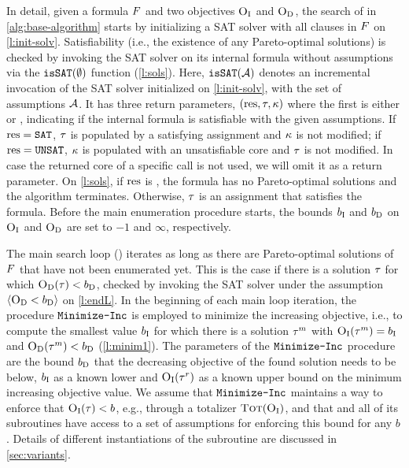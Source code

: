 In detail, given a formula $F$ and two objectives $\textsc{O}_{\text{I}}$ and $\textsc{O}_{\text{D}}$, the search of \algname{} in \cref{alg:base-algorithm} starts by initializing a SAT solver with all clauses in $F$ on \cref{l:init-solv}.
Satisfiability (i.e., the existence of any Pareto-optimal solutions) is checked by invoking the SAT solver on its internal formula without assumptions via the $\texttt{isSAT}(\emptyset)$ function (\cref{l:sols}).
Here, $\texttt{isSAT}(\mathcal{A})$ denotes an incremental invocation of the SAT solver initialized on \cref{l:init-solv}, with the set of assumptions $\mathcal{A}$.
It has three return parameters, $(\text{res},\tau,\kappa)$ where the first is either \sat{} or \unsat{}, indicating if the internal formula is satisfiable with the given assumptions.
If $\text{res}=\texttt{SAT}$, $\tau$ is populated by a satisfying assignment and $\kappa$ is not modified;
if $\text{res}=\texttt{UNSAT}$, $\kappa$ is populated with an unsatisfiable core and $\tau$ is not modified.
In case the returned core of a specific call is not used, we will omit it as a return parameter.
On \cref{l:sols}, if $\text{res}$ is \unsat{}, the formula has no Pareto-optimal solutions and the algorithm terminates.
Otherwise, $\tau$ is an assignment that satisfies the formula.
Before the main enumeration procedure starts, the bounds $b_{\text{I}}$ and $b_{\text{D}}$ on $\textsc{O}_{\text{I}}$ and $\textsc{O}_{\text{D}}$ are set to $-1$ and $\infty$, respectively.

The main search loop () iterates as long as there are Pareto-optimal solutions of $F$ that have not been enumerated yet. 
This is the case if there is a solution $\tau$ for which $\textsc{O}_{\text{D}}(\tau) < b_{\text{D}}$, checked by invoking the SAT solver under the assumption $\langle \textsc{O}_{\text{D}} < b_{\text{D}} \rangle$ on \cref{l:endL}.
In the beginning of each main loop iteration, the procedure $\texttt{Minimize-\allowbreak{}Inc}$ is employed to minimize the increasing objective, i.e., to compute the smallest value $b_{\text{I}}$ for which there is a solution $\tau^m$ with $\textsc{O}_{\text{I}}(\tau^m) = b_{\text{I}}$ and $\textsc{O}_{\text{D}}(\tau^m) < b_{\text{D}}$ (\cref{l:minim1}). 
The parameters of the $\texttt{Minimize-\allowbreak{}Inc}$ procedure are the bound $b_{\text{D}}$ that the decreasing objective of the found solution needs to be below, $b_{\text{I}}$ as a known lower and $\textsc{O}_{\text{I}}(\tau^r)$ as a known upper bound on the minimum increasing objective value.
We assume that $\texttt{Minimize-\allowbreak{}Inc}$ maintains a way to enforce that $\textsc{O}_{\text{I}}(\tau) < b$, e.g., through a totalizer $\textsc{Tot}(\textsc{O}_{\text{I}})$, and that \algname{} and all of its subroutines have access to a set of assumptions for enforcing this bound for any $b$.
Details of different instantiations of the \Min{} subroutine are discussed in \cref{sec:variants}.

